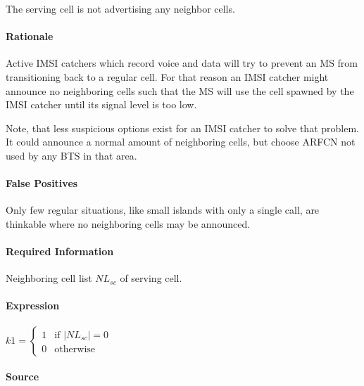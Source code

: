 \documentclass[a4paper,11pt,notitlepage,bigheadings,oneside]{scrartcl}
\begin{document}
\subsubsection{}

The serving cell is not advertising any neighbor cells.

\paragraph{Rationale}

Active IMSI catchers which record voice and data will try to prevent an MS from
transitioning back to a regular cell. For that reason an IMSI catcher might
announce no neighboring cells such that the MS will use the cell spawned by the
IMSI catcher until its signal level is too low.

Note, that less suspicious options exist for an IMSI catcher to solve that
problem. It could announce a normal amount of neighboring cells, but choose
ARFCN not used by any BTS in that area.

\paragraph{False Positives}

Only few regular situations, like small islands with only a single call, are
thinkable where no neighboring cells may be announced.

\paragraph{Required Information}

Neighboring cell list $NL_{sc}$ of serving cell.

\paragraph{Expression}

$k1 =
\begin{cases}
	1 & \text{if } \left|NL_{sc}\right| = 0 \\
	0 & \text{otherwise}
\end{cases}$


\paragraph{Source}
\end{document}
